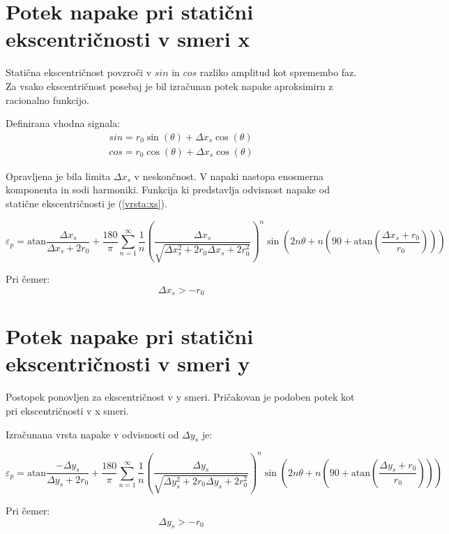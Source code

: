 \newpage
\section{Potek napake pri statični ekscentričnosti v smeri x}

Statična ekscentričnost povzroči v $sin$ in $cos$ razliko amplitud kot spremembo faz. Za vsako ekscentričnost posebaj je bil izračunan potek napake aproksimirn z racionalno funkcijo.

Definirana vhodna signala:
\begin{eqnarray}
\label{xs_analit}
sin = r_0 \sin(\theta) + \Delta x_s \cos(\theta) \\
cos = r_0 \cos(\theta) + \Delta x_s \cos(\theta)
\end{eqnarray}

Opravljena je bila limita $\Delta x_s$ v neskončnost. V napaki nastopa enosmerna komponenta in sodi harmoniki. Funkcija ki predstavlja odvisnost napake od statične ekscentričnosti je (\ref{vrsta:xs}).

 \begin{equation}
 \label{vrsta:xs}
 \varepsilon_p = \mathrm{atan}\frac{\Delta x _s}{\Delta x _s+2r_0}+\frac{180}{\pi} \sum_{n=1}^{\infty}\frac{1}{n} (\frac{\Delta x _s}{\sqrt{\Delta x _s^2+2 r_0 \Delta x _s+2r_0^2}})^n \sin (2n \theta+n (90+ \mathrm{ atan}(\frac{\Delta x _s+r_0}{r_0})))
 \end{equation}
 
 Pri čemer:
 $$\Delta x_s > -r_0$$

 \section{Potek napake pri statični ekscentričnosti v smeri y}
 
 Postopek ponovljen za  ekscentričnost v y smeri. Pričakovan je podoben potek kot pri ekscentričnosti v x smeri.
 
Izračunana vrsta napake v odvisnosti od  $\Delta y_s$ je:
 
  \begin{equation}
   \label{vrsta:ys}
 \varepsilon_p = \mathrm{atan}\frac{-\Delta y _s}{\Delta y _s+2r_0}+\frac{180}{\pi} \sum_{n=1}^{\infty}\frac{1}{n} (\frac{\Delta y _s}{\sqrt{\Delta y _s^2+2 r_0 \Delta y _s+2r_0^2}})^n \sin (2n \theta+n (90+ \mathrm{ atan}(\frac{\Delta y _s+r_0}{r_0})))
 \end{equation}

 Pri čemer:
$$\Delta y_s > -r_0$$

